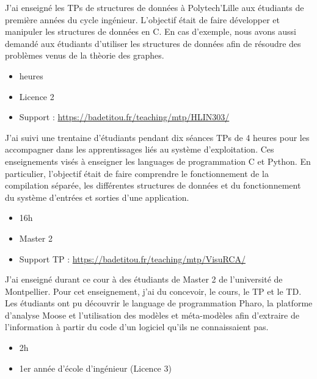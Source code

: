 \documentclass[10pt,a4paper,ragged2e,withhyper]{altacv}
\begin{document}
J'ai enseigné les TPs de structures de données à Polytech'Lille aux étudiants de première années du cycle ingénieur.
L'objectif était de faire développer et manipuler les structures de données en C.
En cas d'exemple, nous avons aussi demandé aux étudiants d'utiliser les structures de données afin de résoudre des problèmes venus de la thèorie des graphes.

\divider


\begin{itemize}
  \item {} heures
  \item Licence 2
  \item Support : \url{https://badetitou.fr/teaching/mtp/HLIN303/}
\end{itemize}

J'ai suivi une trentaine d'étudiants pendant dix séances TPs de 4 heures pour les accompagner dans les apprentissages liés au système d'exploitation.
Ces enseignements visés à enseigner les languages de programmation C et Python.
En particulier, l'objectif était de faire comprendre le fonctionnement de la compilation séparée,
les différentes structures de données
et du fonctionnement du système d'entrées et sorties d'une application.

\divider

\begin{itemize}
\item \faClock 16h
\item Master 2
\item Support TP : \url{https://badetitou.fr/teaching/mtp/VisuRCA/}
\end{itemize}

J'ai enseigné durant ce cour à des étudiants de Master 2 de l'université de Montpellier.
Pour cet enseignement, j'ai du concevoir, le cours, le TP et le TD.
Les étudiants ont pu découvrir le language de programmation Pharo, la platforme d'analyse Moose et l'utilisation des modèles et méta-modèles afin d'extraire de l'information à partir du code d'un logiciel qu'ils ne connaissaient pas.

\divider

\begin{itemize}
\item \faClock 2h
\item 1er année d'école d'ingénieur (Licence 3)
\end{itemize}
\end{document}
